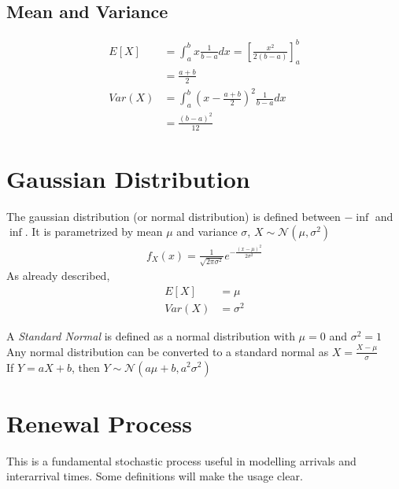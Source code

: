 \documentclass[../probability-notes.tex]{subfiles}
\begin{document}
    \subsection{Mean and Variance}
    \begin{align*}
        E[X] &= \int_{a}^{b} x \frac{1}{b-a} dx = [\frac{x^{2}}{2(b-a)}]_{a}^{b}\\
            &= \frac{a+b}{2}\\
        Var(X) &= \int_{a}^{b} (x - \frac{a+b}{2})^{2} \frac{1}{b-a} dx \\
            &= \frac{(b-a)^{2}}{12}
    \end{align*}

    \section{Gaussian Distribution}
    The gaussian distribution (or normal distribution) is defined between $-\inf$ and $\inf$. It is parametrized by mean $\mu$ and variance $\sigma$, $X \sim \mathcal{N}(\mu, \sigma^{2})$
    \begin{align*}
        f_{X}(x) = \frac{1}{\sqrt{2\pi \sigma^{2}}} e^{-\frac{(x-\mu)^{2}}{2 \sigma^{2}}}
    \end{align*}
    As already described,
    \begin{align*}
        E[X] &= \mu\\
        Var(X) &= \sigma^{2}
    \end{align*}

    A \emph{Standard Normal} is defined as a normal distribution with $\mu = 0$ and $\sigma^{2} = 1$\\
    Any normal distribution can be converted to a standard normal as $X = \frac{X - \mu}{\sigma}$\\
    If $Y = aX + b$, then $Y \sim \mathcal{N}(a \mu + b, a^{2}\sigma^{2})$

    \section{Renewal Process}
    This is a fundamental stochastic process useful in modelling arrivals and interarrival times. Some definitions will make the usage clear.\newline
\end{document}
